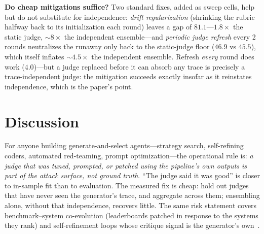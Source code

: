\documentclass[sigconf]{acmart}
\begin{document}
\textbf{Do cheap mitigations suffice?} Two standard fixes, added as sweep cells, help but do not substitute for independence: \emph{drift regularization} (shrinking the rubric halfway back to its initialization each round) leaves a gap of $81.1$---$1.8\times$ the static judge, ${\sim}8\times$ the independent ensemble---and \emph{periodic judge refresh} every 2 rounds neutralizes the runaway only back to the static-judge floor ($46.9$ vs $45.5$), which itself inflates ${\sim}4.5\times$ the independent ensemble. Refresh \emph{every} round does work ($4.0$)---but a judge replaced before it can absorb any trace is precisely a trace-independent judge: the mitigation succeeds exactly insofar as it reinstates independence, which is the paper's point.

\section{Discussion}
For anyone building generate-and-select agents---strategy search, self-refining coders, automated red-teaming, prompt optimization---the operational rule is: \emph{a judge that was tuned, prompted, or patched using the pipeline's own outputs is part of the attack surface, not ground truth}. ``The judge said it was good'' is closer to in-sample fit than to evaluation. The measured fix is cheap: hold out judges that have never seen the generator's trace, and aggregate across them; ensembling alone, without that independence, recovers little. The same risk statement covers benchmark--system co-evolution (leaderboards patched in response to the systems they rank) and self-refinement loops whose critique signal is the generator's own~\cite{wang2022,pan2024}.
\end{document}
